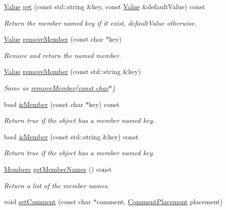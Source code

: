 \begin{DoxyCompactItemize}
\hyperlink{classJson_1_1Value}{Value} \hyperlink{classJson_1_1Value_a54a34264356e01ee9c21a75ccfc809e9}{get} (const std\-::string \&key, const \hyperlink{classJson_1_1Value}{Value} \&default\-Value) const 
\begin{DoxyCompactList}\small\item\em Return the member named key if it exist, default\-Value otherwise. \end{DoxyCompactList}\item 
\hyperlink{classJson_1_1Value}{Value} \hyperlink{classJson_1_1Value_aa52f7873b95d29627d6e83ba96f69aaa}{remove\-Member} (const char $\ast$key)
\begin{DoxyCompactList}\small\item\em Remove and return the named member. \end{DoxyCompactList}\item 
\hyperlink{classJson_1_1Value}{Value} \hyperlink{classJson_1_1Value_ae1f95f7ca3906e6bcc2a7be93210ecba}{remove\-Member} (const std\-::string \&key)
\begin{DoxyCompactList}\small\item\em Same as \hyperlink{classJson_1_1Value_aa52f7873b95d29627d6e83ba96f69aaa}{remove\-Member(const char$\ast$)} \end{DoxyCompactList}\item 
bool \hyperlink{classJson_1_1Value_a196defba501d70ea2b6793afb04108e3}{is\-Member} (const char $\ast$key) const 
\begin{DoxyCompactList}\small\item\em Return true if the object has a member named key. \end{DoxyCompactList}\item 
bool \hyperlink{classJson_1_1Value_af728b5738aaa133f3aad2e39dc4f415e}{is\-Member} (const std\-::string \&key) const 
\begin{DoxyCompactList}\small\item\em Return true if the object has a member named key. \end{DoxyCompactList}\item 
\hyperlink{classJson_1_1Value_ac61bab5a465848b57610379cc07995c3}{Members} \hyperlink{classJson_1_1Value_a179f6d002c2bb916ce0d0b9db9b87ebe}{get\-Member\-Names} () const 
\begin{DoxyCompactList}\small\item\em Return a list of the member names. \end{DoxyCompactList}\item 
void \hyperlink{classJson_1_1Value_a29f3a30f7e5d3af6f38d57999bf5b480}{set\-Comment} (const char $\ast$comment, \hyperlink{namespaceJson_a4fc417c23905b2ae9e2c47d197a45351}{Comment\-Placement} placement)

\end{DoxyCompactItemize}
